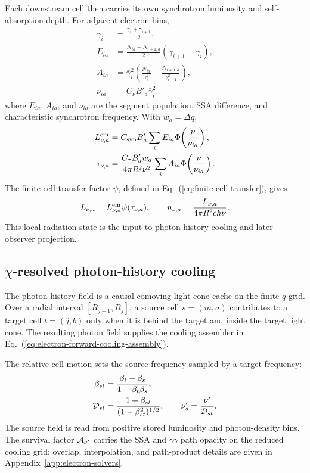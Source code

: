 \documentclass[twocolumn]{aastex702}
\begin{document}
Each downstream cell then carries its own synchrotron luminosity and
self-absorption depth.  For adjacent electron bins,
\begin{equation}
\begin{aligned}
\bar\gamma_i&=\frac{\gamma_i+\gamma_{i+1}}{2},\\
E_{ia}&=\frac{N_{ia}+N_{i+1,a}}{2}(\gamma_{i+1}-\gamma_i),\\
A_{ia}&=\bar\gamma_i^2
\left(\frac{N_{ia}}{\gamma_i^2}
-\frac{N_{i+1,a}}{\gamma_{i+1}^2}\right),\\
\nu_{ia}&=C_\nu B'_a\bar\gamma_i^2 .
\end{aligned}
\end{equation}
where \(E_{ia}\), \(A_{ia}\), and \(\nu_{ia}\) are the segment population, SSA
difference, and characteristic synchrotron frequency.  With \(w_a=\Delta q\),
\begin{equation}
\begin{aligned}
L_{\nu,a}^{\rm em}&=C_{\rm syn}B'_a
\sum_iE_{ia}\Phi\!\left(\frac{\nu}{\nu_{ia}}\right),\\
\tau_{\nu,a}&=
\frac{C_\tau B'_a w_a}{4\pi R^2\nu^2}
\sum_iA_{ia}\Phi\!\left(\frac{\nu}{\nu_{ia}}\right).
\end{aligned}
\end{equation}
The finite-cell transfer factor \(\psi\), defined in
Eq.~(\ref{eq:finite-cell-transfer}), gives
\[
L_{\nu,a}=L_{\nu,a}^{\rm em}\psi(\tau_{\nu,a}),\qquad
n_{\nu,a}=\frac{L_{\nu,a}}{4\pi R^2 c h\nu}.
\]
This local radiation state is the input to photon-history cooling and later
observer projection.

\subsection{\texorpdfstring{\(\chi\)}{chi}-resolved photon-history cooling}

The photon-history field is a causal comoving light-cone cache on the finite
\(q\) grid.  Over a radial interval \([R_{j-1},R_j]\), a source cell
\(s=(m,a)\) contributes to a target cell \(t=(j,b)\) only when it is behind the
target and inside the target light cone.  The resulting photon field supplies
the cooling assembler in Eq.~(\ref{eq:electron-forward-cooling-assembly}).

The relative cell motion sets the source frequency sampled by a target frequency:
\begin{equation}
\begin{aligned}
\beta_{st}&=\frac{\beta_t-\beta_s}{1-\beta_t\beta_s},\\
{\cal D}_{st}&=\frac{1+\beta_{st}}{(1-\beta_{st}^2)^{1/2}},
\qquad
\nu'_s=\frac{\nu'}{{\cal D}_{st}} .
\end{aligned}
\end{equation}
The source field is read from positive stored luminosity and photon-density bins.
The survival factor \({\cal A}_{\nu'}\) carries the SSA and \(\gamma\gamma\)
path opacity on the reduced cooling grid; overlap, interpolation, and path-product
details are given in Appendix~\ref{app:electron-solvers}.
\end{document}
